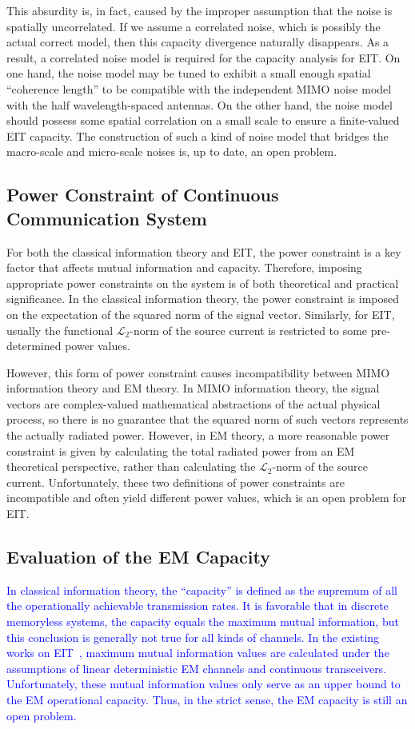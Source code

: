\documentclass[journal,twocolumn]{IEEEtran}
\newcommand{\blue}[1]{\textcolor{blue}{#1}}
\begin{document}
This absurdity is, in fact, caused by the improper assumption that the noise is spatially uncorrelated. 
If we assume a correlated noise, which is possibly the actual correct model, then this capacity divergence naturally disappears. 
As a result, a correlated noise model is required for the capacity analysis for EIT. On one hand, the noise model may be tuned to exhibit a small enough spatial ``coherence length'' to be compatible with the independent MIMO noise model with the half wavelength-spaced antennas. On the other hand, the noise model should possess some spatial correlation on a small scale to ensure a finite-valued EIT capacity. 
The construction of such a kind of noise model that bridges the macro-scale and micro-scale noises is, up to date, an open problem. 

\vspace{-1em}
\subsection{Power Constraint of Continuous Communication System}
For both the classical information theory and EIT, the power constraint is a key factor that affects mutual information and capacity. 
Therefore, imposing appropriate power constraints on the system is of both theoretical and practical significance. 
In the classical information theory, the power constraint is imposed on the expectation of the squared norm of the signal vector.  
Similarly, for EIT, usually the functional $\mathcal{L}_2$-norm of the source current is restricted to some pre-determined power values.  

However, this form of power constraint causes incompatibility between MIMO information theory and EM theory.  
In MIMO information theory, the signal vectors are complex-valued mathematical abstractions of the actual physical process, so there is no guarantee that the squared norm of such vectors represents the actually radiated power. 
However, in EM theory, a more reasonable power constraint is given by calculating the total radiated power from an EM theoretical perspective, rather than calculating the $\mathcal{L}_2$-norm of the source current. 
Unfortunately, these two definitions of power constraints are incompatible and often yield different power values, which is an open problem for EIT. 


\subsection{Evaluation of the EM Capacity}
\blue{In classical information theory, the ``capacity'' is defined as the supremum of all the operationally achievable transmission rates. It is favorable that in discrete memoryless systems, the capacity equals the maximum mutual information, but this conclusion is generally not true for all kinds of channels. In the existing works on EIT~\cite{wan2022mutual,zhang2022pdma,marzetta2022fourier}, maximum mutual information values are calculated under the assumptions of linear deterministic EM channels and continuous transceivers. Unfortunately, these mutual information values only serve as an upper bound to the EM operational capacity. 
Thus, in the strict sense, the EM capacity is still an open problem. 
}
\end{document}
